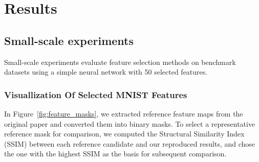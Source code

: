 \documentclass[a4paper,twocolumn]{article} %
\begin{document}
\section{Results}
\subsection{ Small-scale experiments}
Small-scale experiments evaluate feature selection methods on benchmark datasets using a simple neural network with 50 selected features.
\subsubsection{Visuallization Of Selected MNIST Features}

In Figure~\ref{fig:feature_masks}, we extracted reference feature maps from the original paper and converted them into binary masks. To select a representative reference mask for comparison, we computed the Structural Similarity Index (SSIM) between each reference candidate and our reproduced results, and chose the one with the highest SSIM as the basis for subsequent comparison.
\end{document}
